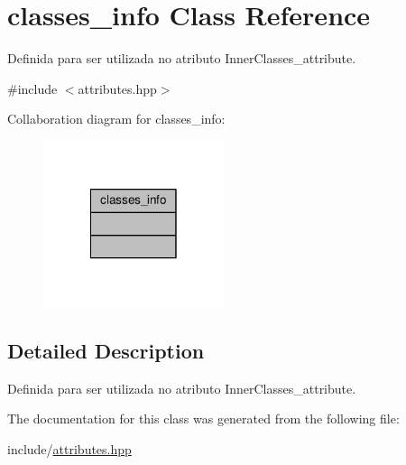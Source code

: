 \hypertarget{classclasses__info}{\section{classes\+\_\+info Class Reference}
\label{classclasses__info}
}


Definida para ser utilizada no atributo Inner\+Classes\+\_\+attribute.  




{\ttfamily \#include $<$attributes.\+hpp$>$}



Collaboration diagram for classes\+\_\+info\+:\nopagebreak
\begin{figure}[H]
\begin{center}
\leavevmode
\includegraphics[width=150pt]{classclasses__info__coll__graph}
\end{center}
\end{figure}


\subsection{Detailed Description}
Definida para ser utilizada no atributo Inner\+Classes\+\_\+attribute. 

The documentation for this class was generated from the following file\+:\begin{DoxyCompactItemize}
\item 
include/\hyperlink{attributes_8hpp}{attributes.\+hpp}\end{DoxyCompactItemize}
